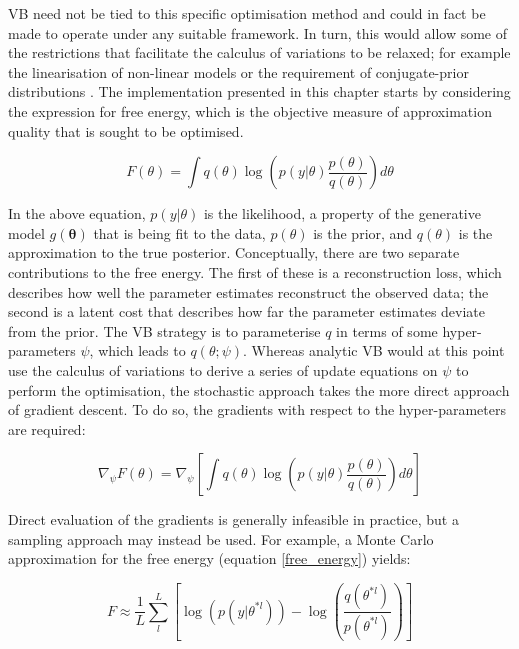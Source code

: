 \documentclass[12pt]{report}
\renewcommand{\vec}[1]{\mathbf{#1}}
\begin{document}
VB need not be tied to this specific optimisation method and could in fact be made to operate under any suitable framework. In turn, this would allow some of the restrictions that facilitate the calculus of variations to be relaxed; for example the linearisation of non-linear models or the requirement of conjugate-prior distributions \cite{Chappell2009}. The implementation presented in this chapter starts by considering the expression for free energy, which is the objective measure of approximation quality that is sought to be optimised. 

\begin{equation}
\label{free_energy}
F(\theta) = \int q(\theta) \log \left( p(y|\theta) \frac{p(\theta)}{q(\theta)} \right) d\theta
\end{equation}

In the above equation, $p(y|\theta)$ is the likelihood, a property of the generative model $g(\vec{\theta})$ that is being fit to the data, $p(\theta)$ is the prior, and $q(\theta)$ is the approximation to the true posterior. Conceptually, there are two separate contributions to the free energy. The first of these is a reconstruction loss, which describes how well the parameter estimates reconstruct the observed data; the second is a latent cost that describes how far the parameter estimates deviate from the prior. The VB strategy is to parameterise $q$ in terms of some hyper-parameters $\psi$, which leads to $q(\theta; \psi)$. Whereas analytic VB would at this point use the calculus of variations to derive a series of update equations on $\psi$ to perform the optimisation, the stochastic approach takes the more direct approach of gradient descent. To do so, the gradients with respect to the hyper-parameters are required: 

\begin{equation}
\nabla_{\psi} F(\theta) = \nabla_{\psi} \left[ \int q(\theta) \log \left( p(y|\theta) \frac{p(\theta)}{q(\theta)} \right) d\theta \right]
\end{equation}

Direct evaluation of the gradients is generally infeasible in practice, but a sampling approach may instead be used. For example, a Monte Carlo approximation for the free energy (equation \ref{free_energy}) yields: 

\begin{equation}
\label{free_energy_approx}
F \approx \frac{1}{L} \sum^{L}_{l} \left[ \log( p(y|\theta^{*l}) ) - \log \left( \frac{q(\theta^{*l})}{p(\theta^{*l})} \right) \right]
\end{equation}
\end{document}
